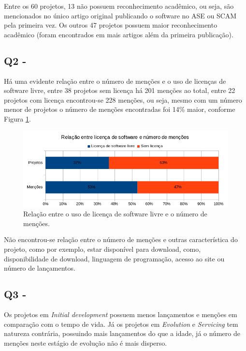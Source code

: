 Entre os 60 projetos, 13 não possuem reconhecimento acadêmico, ou seja, são
mencionados no único artigo original publicando o software no ASE ou SCAM pela
primeira vez. Os outros 47 projetos possuem maior reconhecimento acadêmico
(foram encontrados em mais artigos além da primeira publicação).


\subsection{Q2 - \QuestaoDois} %

Há uma evidente relação entre o número de menções e o uso de licenças de
software livre, entre 38 projetos sem licença há 201 menções ao total, entre 22
projetos com licença encontrou-se 228 menções, ou seja, mesmo com um número menor de
projetos o número de menções encontradas foi 14\% maior, conforme Figura \ref{license-vs-mentions}.

\begin{figure}[h]
  \center
  \includegraphics[scale=0.6]{imagens/license-vs-mentions.png}
  \caption{Relação entre o uso de licença de software livre e o número de menções.}
  \label{license-vs-mentions}
\end{figure}

Não encontrou-se relação entre o número de menções e outras característica do
projeto, como por exemplo, estar disponível para download, como,
disponibilidade de download, linguagem de programação, acesso ao site ou número
de lançamentos.

\subsection{Q3 - \QuestaoTres} %

Os projetos em {\it Initial development} possuem menos lançamentos e menções em
comparação com o tempo de vida.  Já os projetos em {\it Evolution} e {\it
Servicing} tem natureza contrária, possuindo mais lançamentos do que a idade,
já o número de menções neste estágio de evolução não é mais disperso.


